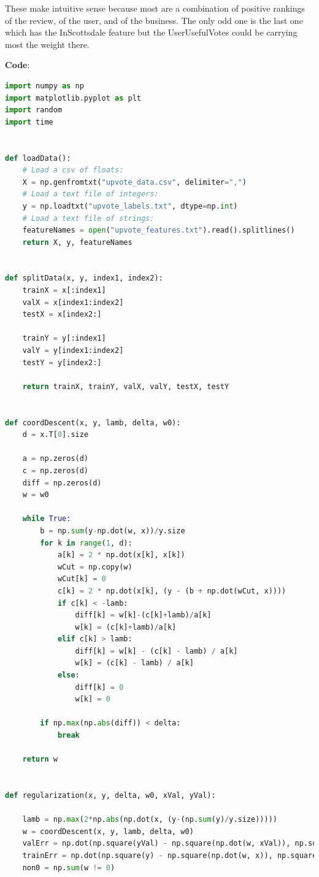 \documentclass{article}
\newcommand{\1}{\mathbf{1}}
\begin{document}
These make intuitive sense because most are a combination of positive rankings of the review, of the user, and of the business. The only odd one is the last one which has the InScottsdale feature but the UserUsefulVotes could be carrying most the weight there.

\textbf{Code}:
\begin{lstlisting}[language=Python]
import numpy as np
import matplotlib.pyplot as plt
import random
import time


def loadData():
    # Load a csv of floats:
    X = np.genfromtxt("upvote_data.csv", delimiter=",")
    # Load a text file of integers:
    y = np.loadtxt("upvote_labels.txt", dtype=np.int)
    # Load a text file of strings:
    featureNames = open("upvote_features.txt").read().splitlines()
    return X, y, featureNames


def splitData(x, y, index1, index2):
    trainX = x[:index1]
    valX = x[index1:index2]
    testX = x[index2:]

    trainY = y[:index1]
    valY = y[index1:index2]
    testY = y[index2:]

    return trainX, trainY, valX, valY, testX, testY


def coordDescent(x, y, lamb, delta, w0):
    d = x.T[0].size

    a = np.zeros(d)
    c = np.zeros(d)
    diff = np.zeros(d)
    w = w0

    while True:
        b = np.sum(y-np.dot(w, x))/y.size
        for k in range(1, d):
            a[k] = 2 * np.dot(x[k], x[k])
            wCut = np.copy(w)
            wCut[k] = 0
            c[k] = 2 * np.dot(x[k], (y - (b + np.dot(wCut, x))))
            if c[k] < -lamb:
                diff[k] = w[k]-(c[k]+lamb)/a[k]
                w[k] = (c[k]+lamb)/a[k]
            elif c[k] > lamb:
                diff[k] = w[k] - (c[k] - lamb) / a[k]
                w[k] = (c[k] - lamb) / a[k]
            else:
                diff[k] = 0
                w[k] = 0

        if np.max(np.abs(diff)) < delta:
            break

    return w


def regularization(x, y, delta, w0, xVal, yVal):

    lamb = np.max(2*np.abs(np.dot(x, (y-(np.sum(y)/y.size)))))
    w = coordDescent(x, y, lamb, delta, w0)
    valErr = np.dot(np.square(yVal) - np.square(np.dot(w, xVal)), np.square(yVal) - np.square(np.dot(w, xVal)))
    trainErr = np.dot(np.square(y) - np.square(np.dot(w, x)), np.square(y) - np.square(np.dot(w, x)))
    non0 = np.sum(w != 0)


\end{lstlisting}
\end{document}
